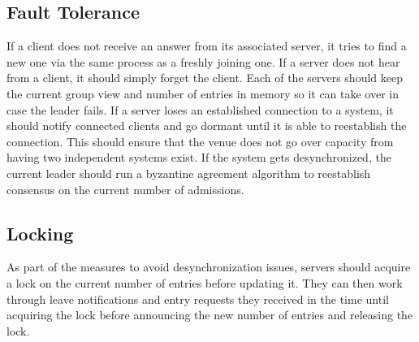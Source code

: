 \documentclass[runningheads]{llncs}
\begin{document}
\subsection{Fault Tolerance}
If a client does not receive an answer from its associated server, it tries to find a new one via the same process as a freshly joining one.
If a server does not hear from a client, it should simply forget the client.
Each of the servers should keep the current group view and number of entries in memory so it can take over in case the leader fails.
If a server loses an established connection to a system, it should notify connected clients and go dormant until it is able to reestablish the connection.	%
This should ensure that the venue does not go over capacity from having two independent systems exist. %
If the system gets desynchronized, the current leader should run a byzantine agreement algorithm to reestablish consensus on the current number of admissions.

\subsection{Locking}
As part of the measures to avoid desynchronization issues, servers should acquire a lock on the current number of entries before updating it.
They can then work through leave notifications and entry requests they received in the time until acquiring the lock before announcing the new number of entries and releasing the lock.
\end{document}
